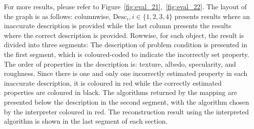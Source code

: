 For more results, please refer to Figure~\ref{fig:eval_21},~\ref{fig:eval_22}. The layout of the graph is as follows: columnwise, $\text{Desc}_i, i\in\{1, 2, 3, 4\}$ presents results where an inaccurate description is provided while the last column presents the results where the correct description is provided. Rowwise, for each object, the result is divided into three segments: The description of problem condition is presented in the first segment, which is coloured-coded to indicate the incorrectly set property. The order of properties in the description is: texture, albedo, specularity, and roughness. Since there is one and only one incorrectly estimated property in each inaccurate description, it is coloured in red while the correctly estimated properties are coloured in black. The algorithms returned by the mapping are presented below the description in the second segment, with the algorithm chosen by the interpreter coloured in red. The reconstruction result using the interpreted algorithm is shown in the last segment of each section.
